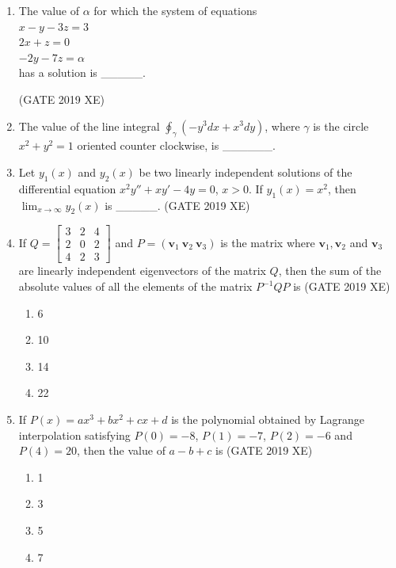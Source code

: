 \documentclass[journal,12pt,onecolumn]{IEEEtran}
\newcommand{\myvec}[1]{\begin{bmatrix}#1\end{bmatrix}}
\begin{document}
\begin{enumerate}
\item The value of $\alpha$ for which the system of equations\\
$x-y-3z=3$\\
$2x+z=0$\\
$-2y-7z=\alpha$\\
 has a solution is \_\_\_\_\_.

\hfill{(GATE 2019 XE)} \\

\item The value of the line integral $\displaystyle \oint_{\gamma}(-y^3dx + x^3dy)$, where $\gamma$ is the circle $x^2+y^2=1$ oriented counter clockwise, is \_\_\_\_\_\_. \\


\item Let $y_1(x)$ and $y_2(x)$ be two linearly independent solutions of the differential equation $x^2y''+xy'-4y=0$, $x>0$. If $y_1(x)=x^2$, then $\displaystyle \lim_{x\to\infty} y_2(x)$ is \_\_\_\_\_.
\hfill{(GATE 2019 XE)} \\

\newpage 

\item If 
$Q = \myvec{3 & 2 & 4 \\ 2 & 0 & 2 \\ 4 & 2 & 3}$ and $P=(\mathbf{v}_1\ \mathbf{v}_2\ \mathbf{v}_3)$ is the matrix where $\mathbf{v}_1, \mathbf{v}_2$ and $\mathbf{v}_3$ are linearly independent eigenvectors of the matrix $Q$, then the sum of the absolute values of all the elements of the matrix $P^{-1}QP$ is
\hfill{(GATE 2019 XE)} \\

\begin{multicols}{2}
\begin{enumerate}
\item 6
\item 10
\item 14
\item 22
\end{enumerate}
\end{multicols}

\item If $P(x)=a x^3+b x^2+c x+d$ is the polynomial obtained by Lagrange interpolation satisfying $P(0)=-8$, $P(1)=-7$, $P(2)=-6$ and $P(4)=20$, then the value of $a-b+c$ is
\hfill{(GATE 2019 XE)} \\
\begin{multicols}{2}
\begin{enumerate}
\item 1
\item 3
\item 5
\item 7
\end{enumerate}
\end{multicols}


\end{enumerate}
\end{document}
